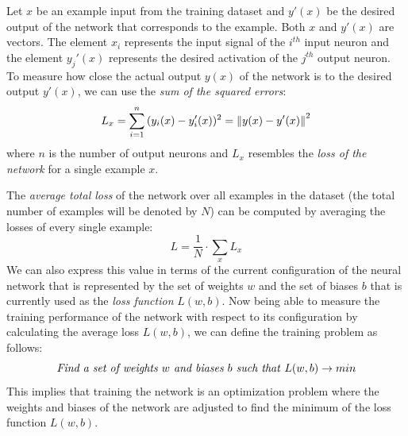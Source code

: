 Let \(x\) be an example input from the training dataset and \(y'(x)\)
be the desired output of the network that corresponds to the
example. Both \(x\) and \(y'(x)\) are vectors. The element \(x_i\) represents the
input signal of the \(i^{th}\) input neuron and the element \(y_j'(x)\)
represents the desired activation of the \(j^{th}\) output neuron. To
measure how close the actual output \(y(x)\) of the network is to the
desired output \(y'(x)\), we can use the \textit{sum of the squared
  errors}:
\begin{equation}
  L_x = \sum_{i=1}^{n}{(y_i(x)-y_i'(x))^2} = \left\lVert y(x)-y'(x)\right\rVert^2
\end{equation}
where \(n\) is the number of output neurons and \(L_x\) resembles the
\textit{loss of the network} for a single example \(x\).

The \textit{average total loss} of the network over all examples in
the dataset (the total number of examples will be denoted by \(N\))
can be computed by averaging the losses of every single example:
\begin{equation}
  \label{eq:loss}
  L = \frac{1}{N} \cdot \sum_{x}{L_x}
\end{equation}
We can also express this value in terms of the current configuration
of the neural network that is represented by the set of weights \(w\)
and the set of biases \(b\) that is currently used as the \textit{loss
function} \(L(w, b)\).
Now being able to measure the training performance of the network with
respect to its configuration by
calculating the average loss \(L(w, b)\), we can define the training
problem as follows:
\begin{equation*}
  \text{\textit{Find a set of weights \(w\) and biases \(b\) such
      that} } L(w, b) \rightarrow min
\end{equation*}
This implies that training the network is an optimization
problem where the weights and biases of the network are
adjusted to find the minimum of the loss function \(L(w, b)\).

